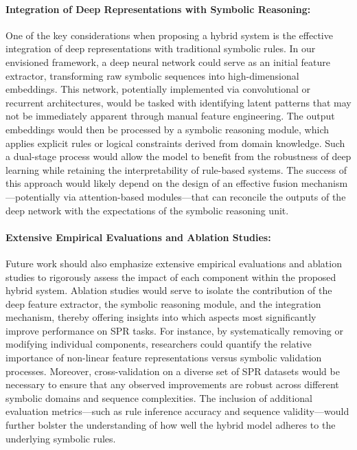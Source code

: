 \documentclass{article}
\begin{document}
\paragraph{Integration of Deep Representations with Symbolic Reasoning:} One of the key considerations when proposing a hybrid system is the effective integration of deep representations with traditional symbolic rules. In our envisioned framework, a deep neural network could serve as an initial feature extractor, transforming raw symbolic sequences into high-dimensional embeddings. This network, potentially implemented via convolutional or recurrent architectures, would be tasked with identifying latent patterns that may not be immediately apparent through manual feature engineering. The output embeddings would then be processed by a symbolic reasoning module, which applies explicit rules or logical constraints derived from domain knowledge. Such a dual-stage process would allow the model to benefit from the robustness of deep learning while retaining the interpretability of rule-based systems. The success of this approach would likely depend on the design of an effective fusion mechanism—potentially via attention-based modules—that can reconcile the outputs of the deep network with the expectations of the symbolic reasoning unit.

\paragraph{Extensive Empirical Evaluations and Ablation Studies:} Future work should also emphasize extensive empirical evaluations and ablation studies to rigorously assess the impact of each component within the proposed hybrid system. Ablation studies would serve to isolate the contribution of the deep feature extractor, the symbolic reasoning module, and the integration mechanism, thereby offering insights into which aspects most significantly improve performance on SPR tasks. For instance, by systematically removing or modifying individual components, researchers could quantify the relative importance of non-linear feature representations versus symbolic validation processes. Moreover, cross-validation on a diverse set of SPR datasets would be necessary to ensure that any observed improvements are robust across different symbolic domains and sequence complexities. The inclusion of additional evaluation metrics—such as rule inference accuracy and sequence validity—would further bolster the understanding of how well the hybrid model adheres to the underlying symbolic rules.
\end{document}
